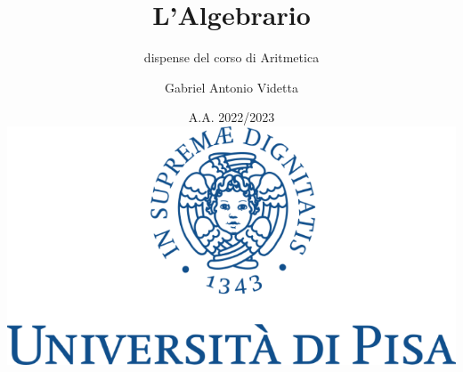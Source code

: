 \documentclass[11pt]{scrbook}
\begin{document}
\title{L'Algebrario}
\subtitle{dispense del corso di Aritmetica}
\author{Gabriel Antonio Videtta}
\date{A.A. 2022/2023 \\ \vskip 1in \includegraphics[scale=0.3]{logo.png}}
\maketitle

\newpage
\thispagestyle{empty}
~\newpage



\newpage
\thispagestyle{empty}
~\newpage

\tableofcontents

\newpage
\thispagestyle{empty}
~\newpage



\newpage
\thispagestyle{empty}
~\newpage



\newpage
\thispagestyle{empty}
~\newpage



\newpage
\thispagestyle{empty}
~\newpage



\newpage
\thispagestyle{empty}
~\newpage



\newpage
\thispagestyle{empty}
~\newpage



\newpage
\thispagestyle{empty}
~\newpage


\end{document}
